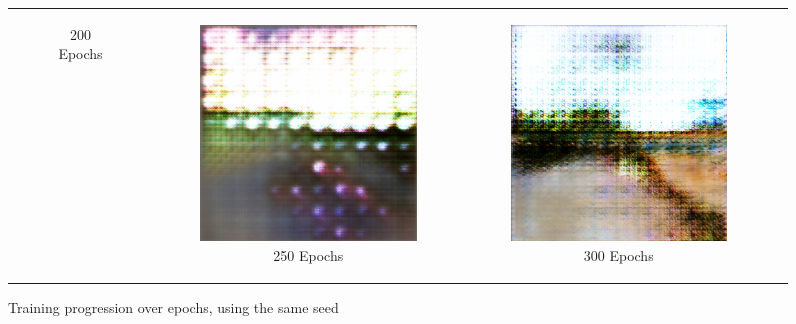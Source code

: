 \documentclass{article}
\begin{document}
\begin{figure}[H]
\begin{tabular}{cccc}
\begin{subfigure}{0.23\textwidth}
            \caption{200 Epochs}
        \end{subfigure} &
        \begin{subfigure}{0.23\textwidth}
            \centering
            \includegraphics[width=\linewidth]{world_epoch_250_11.png}
            \caption{250 Epochs}
        \end{subfigure} &
        \begin{subfigure}{0.23\textwidth}
            \centering
            \includegraphics[width=\linewidth]{world_epoch_300_11.png}
            \caption{300 Epochs}
        \end{subfigure} 
    \end{tabular}
    \caption{Training progression over epochs, using the same seed}
    \label{fig:results}
\end{figure}
\end{document}
